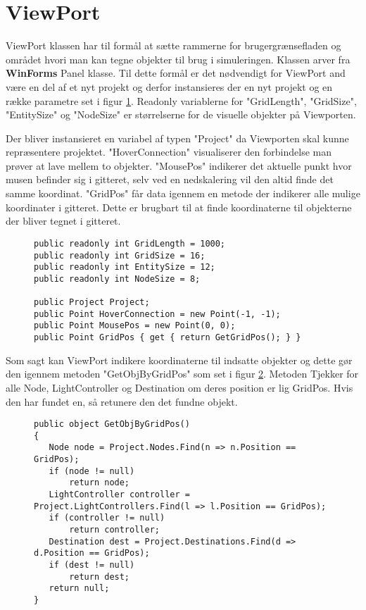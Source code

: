 \section{ViewPort}\label{ViewPort}

ViewPort klassen har til formål at sætte rammerne for brugergrænsefladen og området hvori man kan tegne objekter til brug i simuleringen. Klassen arver fra \textbf{WinForms} Panel klasse. Til dette formål er det nødvendigt for ViewPort and være en del af et nyt projekt og derfor instansieres der en nyt projekt og en række parametre set i figur \ref{ViewportParameters}. Readonly variablerne for "GridLength", "GridSize", "EntitySize" og "NodeSize" er størrelserne for de visuelle objekter på Viewporten.

\vspace{5mm}

Der bliver instansieret en variabel af typen "Project" da Viewporten skal kunne repræsentere projektet. "HoverConnection" visualiserer den forbindelse man prøver at lave mellem to objekter. "MousePos" indikerer det aktuelle punkt hvor musen befinder sig i gitteret, selv ved en nedskalering vil den altid finde det samme koordinat. "GridPos" får data igennem en metode der indikerer alle mulige koordinater i gitteret. Dette er brugbart til at finde koordinaterne til objekterne der bliver tegnet i gitteret.

\begin{figure}[H]
\begin{lstlisting}
public readonly int GridLength = 1000;
public readonly int GridSize = 16;
public readonly int EntitySize = 12;
public readonly int NodeSize = 8;

public Project Project;
public Point HoverConnection = new Point(-1, -1);
public Point MousePos = new Point(0, 0);
public Point GridPos { get { return GetGridPos(); } }
\end{lstlisting}
\caption{}
\label{ViewportParameters}
\end{figure}

Som sagt kan ViewPort indikere koordinaterne til indsatte objekter og dette gør den igennem metoden "GetObjByGridPos" som set i figur \ref{ViewportGetObjByGridPos}. Metoden Tjekker for alle Node, LightController og Destination om deres position er lig GridPos. Hvis den har fundet en, så retunere den det fundne objekt.

\begin{figure}
\begin{lstlisting}
public object GetObjByGridPos()
{
   Node node = Project.Nodes.Find(n => n.Position == GridPos);
   if (node != null)
       return node;
   LightController controller = Project.LightControllers.Find(l => l.Position == GridPos);
   if (controller != null)
	   return controller;
   Destination dest = Project.Destinations.Find(d => d.Position == GridPos);
   if (dest != null)
	   return dest;
   return null;
}
\end{lstlisting}
\caption{}
\label{ViewportGetObjByGridPos}
\end{figure}
